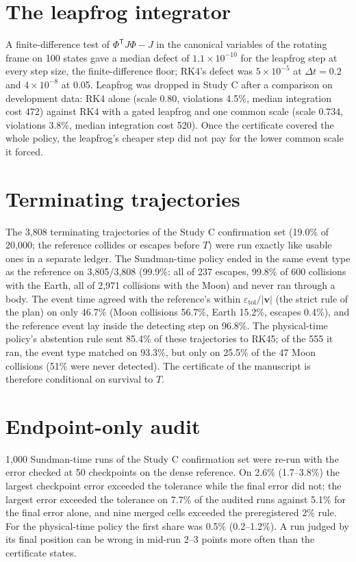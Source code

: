 \documentclass[10pt,letterpaper]{article}
\newcommand{\tol}{\varepsilon_{\mathrm{tol}}}
\begin{document}
\section{The leapfrog integrator}
\label{sec:leapfrog}
A finite-difference test of $\Phi^{\mathsf T} J\Phi - J$ in the canonical variables of the rotating frame on 100 states gave a median defect of
$1.1\times10^{-10}$ for the leapfrog step at every step size, the finite-difference floor; RK4's defect was $5\times10^{-5}$ at $\Delta t = 0.2$ and
$4\times10^{-8}$ at 0.05. Leapfrog was dropped in Study C after a comparison on development data: RK4 alone (scale 0.80,
violations 4.5\%, median integration cost 472) against RK4 with a gated leapfrog and one common scale (scale 0.734, violations 3.8\%, median
integration cost 520). Once the certificate covered the whole policy, the leapfrog's cheaper step did not pay for the lower common scale it forced.

\section{Terminating trajectories}
\label{sec:term}
The 3,808 terminating trajectories of the Study C confirmation set (19.0\% of 20,000; the reference collides or escapes before $T$) were run exactly
like usable ones in a separate ledger. The Sundman-time policy ended in the same event type as the reference on 3,805/3,808 (99.9\%: all of 237
escapes, 99.8\% of 600 collisions with the Earth, all of 2,971 collisions with the Moon) and never ran through a body. The event time agreed with the
reference's within $\tol/|\boldsymbol v|$ (the strict rule of the plan) on only 46.7\% (Moon collisions 56.7\%, Earth 15.2\%, escapes 0.4\%), and the
reference event lay inside the detecting step on 96.8\%. The physical-time policy's abstention rule sent 85.4\% of these trajectories to RK45; of the
555 it ran, the event type matched on 93.3\%, but only on 25.5\% of the 47 Moon collisions (51\% were never detected). The certificate of the
manuscript is therefore conditional on survival to $T$.

\section{Endpoint-only audit}
\label{sec:audit}
1,000 Sundman-time runs of the Study C confirmation set were re-run with the error checked at 50 checkpoints on the dense reference. On 2.6\%
(1.7--3.8\%) the largest checkpoint error exceeded the tolerance while the final error did not; the largest error exceeded the tolerance on 7.7\% of
the audited runs against 5.1\% for the final error alone, and nine merged cells exceeded the preregistered 2\% rule. For the physical-time policy the
first share was 0.5\% (0.2--1.2\%). A run judged by its final position can be wrong in mid-run 2--3 points more often than the certificate states.
\end{document}
